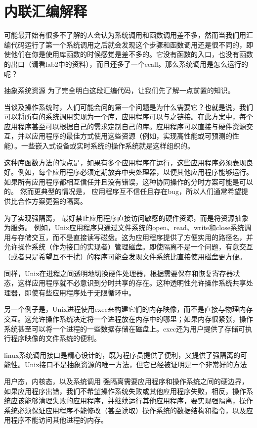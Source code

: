 \documentclass[lang=cn,10pt]{elegantbook}
\begin{document}
\section{内联汇编解释}
可能最开始有很多不了解的人会认为系统调用和函数调用差不多，然而当我们用汇编代码运行了第一个系统调用之后就会发现这个步骤和函数调用还是很不同的，即使他们在你是使用库函数的时候感觉是差不多的。它没有函数的入口，也没有函数的出口（请看lab2中的资料），而且还多了一个ecall。那么系统调用是怎么运行的呢？

抽象系统资源
为了完全明白这段汇编代码，让我们先了解一点前置的知识。

当谈及操作系统时，人们可能会问的第一个问题是为什么需要它？也就是说，我们可以将所有的系统调用实现为一个库，应用程序可以与之链接。在此方案中，每个应用程序甚至可以根据自己的需求定制自己的库。应用程序可以直接与硬件资源交互，并以应用程序的最佳方式使用这些资源（例如，实现高性能或可预测的性能）。一些嵌入式设备或实时系统的操作系统就是这样组织的。

这种库函数方法的缺点是，如果有多个应用程序在运行，这些应用程序必须表现良好。例如，每个应用程序必须定期放弃中央处理器，以便其他应用程序能够运行。如果所有应用程序都相互信任并且没有错误，这种协同操作的分时方案可能是可以的。 然而更典型的情况是， 应用程序互不信任且存在bug，所以人们通常希望提供比合作方案更强的隔离。

为了实现强隔离， 最好禁止应用程序直接访问敏感的硬件资源，而是将资源抽象为服务。 例如，Unix应用程序只通过文件系统的open、read、write和close系统调用与存储交互，而不是直接读写磁盘。这为应用程序提供了方便实用的路径名，并允许操作系统（作为接口的实现者）管理磁盘。即使隔离不是一个问题，有意交互（或者只是希望互不干扰）的程序可能会发现文件系统比直接使用磁盘更方便。

同样，Unix在进程之间透明地切换硬件处理器，根据需要保存和恢复寄存器状态，这样应用程序就不必意识到分时共享的存在。这种透明性允许操作系统共享处理器，即使有些应用程序处于无限循环中。

另一个例子是，Unix进程使用exec来构建它们的内存映像，而不是直接与物理内存交互。这允许操作系统决定将一个进程放在内存中的哪里；如果内存很紧张，操作系统甚至可以将一个进程的一些数据存储在磁盘上。exec还为用户提供了存储可执行程序映像的文件系统的便利。

linux系统调用接口是精心设计的，既为程序员提供了便利，又提供了强隔离的可能性。Unix接口不是抽象资源的唯一方法，但它已经被证明是一个非常好的方法

用户态，内核态，以及系统调用
强隔离需要应用程序和操作系统之间的硬边界，如果应用程序出错，我们不希望操作系统失败或其他应用程序失败，相反，操作系统应该能够清理失败的应用程序，并继续运行其他应用程序，要实现强隔离，操作系统必须保证应用程序不能修改（甚至读取）操作系统的数据结构和指令，以及应用程序不能访问其他进程的内存。
\end{document}
